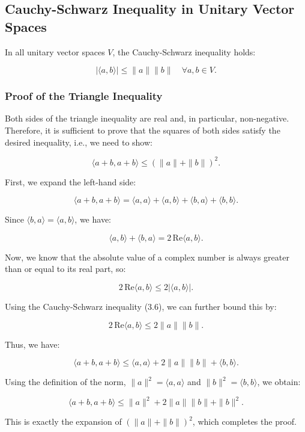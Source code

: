 \subsection{Cauchy-Schwarz Inequality in Unitary Vector Spaces}

In all unitary vector spaces \( V \), the Cauchy-Schwarz inequality holds:

\[
| \langle a, b \rangle | \leq \| a \| \| b \| \quad \forall a, b \in V.
\]

\subsubsection*{Proof of the Triangle Inequality}

Both sides of the triangle inequality are real and, in particular, non-negative. Therefore, it is sufficient to prove that the squares of both sides satisfy the desired inequality, i.e., we need to show:

\[
\langle a + b, a + b \rangle \leq (\|a\| + \|b\|)^2.
\]

First, we expand the left-hand side:

\[
\langle a + b, a + b \rangle = \langle a, a \rangle + \langle a, b \rangle + \langle b, a \rangle + \langle b, b \rangle.
\]

Since \( \langle b, a \rangle = \langle a, b \rangle \), we have:

\[
\langle a, b \rangle + \langle b, a \rangle = 2 \, \text{Re} \langle a, b \rangle.
\]

Now, we know that the absolute value of a complex number is always greater than or equal to its real part, so:

\[
2 \, \text{Re} \langle a, b \rangle \leq 2 |\langle a, b \rangle|.
\]

Using the Cauchy-Schwarz inequality (3.6), we can further bound this by:

\[
2 \, \text{Re} \langle a, b \rangle \leq 2 \|a\| \|b\|.
\]

Thus, we have:

\[
\langle a + b, a + b \rangle \leq \langle a, a \rangle + 2 \|a\| \|b\| + \langle b, b \rangle.
\]

Using the definition of the norm, \( \|a\|^2 = \langle a, a \rangle \) and \( \|b\|^2 = \langle b, b \rangle \), we obtain:

\[
\langle a + b, a + b \rangle \leq \|a\|^2 + 2 \|a\| \|b\| + \|b\|^2.
\]

This is exactly the expansion of \( (\|a\| + \|b\|)^2 \), which completes the proof.
\QED
\newpage

